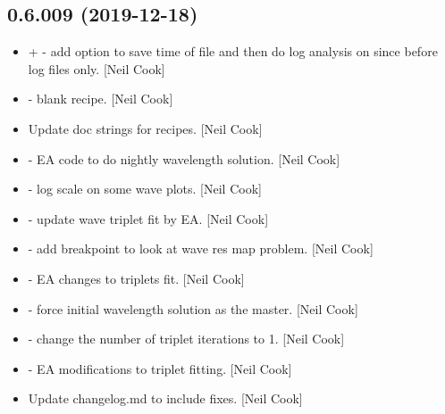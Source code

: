 \documentclass[a4paper,10pt,english]{report}
\begin{document}
\subsection{0.6.009 (2019-12-18)}
\label{\detokenize{misc/changelog:id10}}\begin{itemize}
\item {} 
 +  - add option to save time of
file and then do log analysis on \textendash{}since \textendash{}before log files only.
{[}Neil Cook{]}

\item {} 
 - blank recipe. {[}Neil Cook{]}

\item {} 
Update doc strings for recipes. {[}Neil Cook{]}

\item {} 
 - EA code to do nightly
wavelength solution. {[}Neil Cook{]}

\item {} 
 - log scale on some wave plots. {[}Neil Cook{]}

\item {} 
 - update wave triplet fit by EA. {[}Neil Cook{]}

\item {} 
 - add breakpoint to look at wave res map
problem. {[}Neil Cook{]}

\item {} 
 - EA changes to triplets fit. {[}Neil Cook{]}

\item {} 
 - force initial wavelength solution
as the master. {[}Neil Cook{]}

\item {} 
 - change the number of
triplet iterations to 1. {[}Neil Cook{]}

\item {} 
 - EA modifications to triplet fitting. {[}Neil
Cook{]}

\item {} 
Update changelog.md to include  fixes. {[}Neil Cook{]}

\end{itemize}
\end{document}
